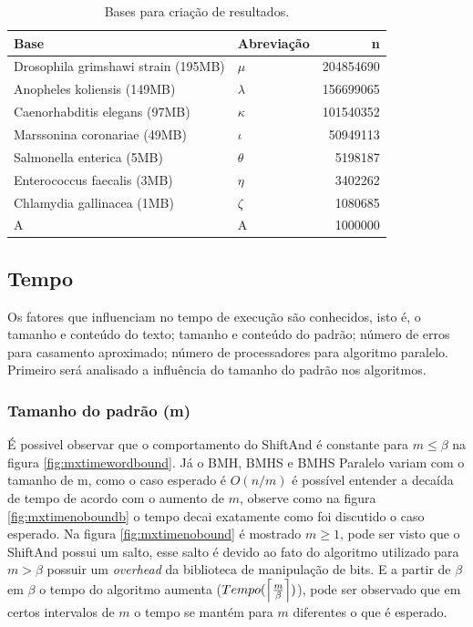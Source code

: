 \documentclass[11pt]{article}
\begin{document}
\begin{table}[htbp]
\centering
\begin{tabular}{llr}
\hline
Base & Abreviação & n\\
\hline
Drosophila grimshawi strain (195MB) & \(\mu\) & 204854690\\
Anopheles koliensis (149MB) & \(\lambda\) & 156699065\\
Caenorhabditis elegans (97MB) & \(\kappa\) & 101540352\\
Marssonina coronariae (49MB) & \(\iota\) & 50949113\\
Salmonella enterica (5MB) & \(\theta\) & 5198187\\
Enterococcus faecalis (3MB) & \(\eta\) & 3402262\\
Chlamydia gallinacea (1MB) & \(\zeta\) & 1080685\\
A & A & 1000000\\
\hline
\end{tabular}
\caption{\label{tab:bases}
Bases para criação de resultados.\cite{genomelist}}

\end{table}

\subsection{Tempo}
\label{sec:orgc50077f}

Os fatores que influenciam no tempo de execução são conhecidos, isto é, o tamanho e conteúdo do texto; tamanho e conteúdo do padrão; número de erros para casamento aproximado; número de processadores para algoritmo paralelo. Primeiro será analisado a influência do tamanho do padrão nos algoritmos.

\subsubsection{Tamanho do padrão (m)}
\label{sec:org2629314}
É possivel observar que o comportamento do ShiftAnd é constante para \(m\leq \beta\) na figura \ref{fig:mxtimewordbound}. Já o BMH, BMHS e BMHS Paralelo variam com o tamanho de m, como o caso esperado é \(O(n/m)\) é possível entender a decaída de tempo de acordo com o aumento de \(m\), observe como na figura \ref{fig:mxtimenoboundb} o tempo decai exatamente como foi discutido o caso esperado. Na figura \ref{fig:mxtimenobound} é mostrado \(m\geq 1\), pode ser visto que o ShiftAnd possui um salto, esse salto é devido ao fato do algoritmo utilizado para \(m>\beta\) possuir um \emph{overhead} da biblioteca de manipulação de bits. E a partir de \(\beta\) em \(\beta\) o tempo do algoritmo aumenta (\(Tempo(\ceil*{\frac{m}{\beta}})\)), pode ser observado que em certos intervalos de \(m\) o tempo se mantém para \(m\) diferentes o que é esperado.
\end{document}
